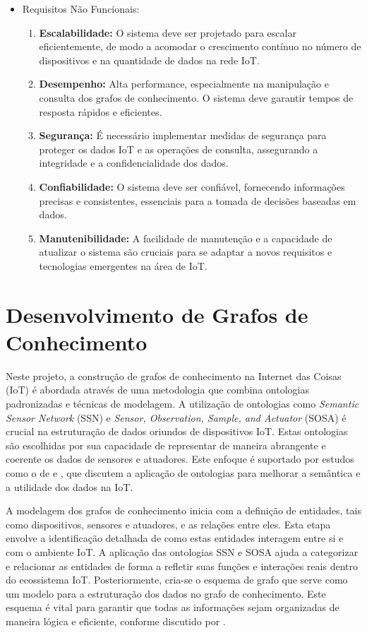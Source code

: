 \begin{itemize}
    \item Requisitos Não Funcionais:
    \begin{enumerate}
        \item \textbf{Escalabilidade:} O sistema deve ser projetado para escalar eficientemente, de modo a acomodar o crescimento contínuo no número de dispositivos e na quantidade de dados na rede IoT.
        \item \textbf{Desempenho:} Alta performance, especialmente na manipulação e consulta dos grafos de conhecimento. O sistema deve garantir tempos de resposta rápidos e eficientes.
        \item \textbf{Segurança:} É necessário implementar medidas de segurança para proteger os dados IoT e as operações de consulta, assegurando a integridade e a confidencialidade dos dados.
        \item \textbf{Confiabilidade:} O sistema deve ser confiável, fornecendo informações precisas e consistentes, essenciais para a tomada de decisões baseadas em dados.
        \item \textbf{Manutenibilidade:} A facilidade de manutenção e a capacidade de atualizar o sistema são cruciais para se adaptar a novos requisitos e tecnologias emergentes na área de IoT.
    \end{enumerate}
\end{itemize}

\section{Desenvolvimento de Grafos de Conhecimento}

Neste projeto, a construção de grafos de conhecimento na Internet das Coisas (IoT) é abordada através de uma metodologia que combina ontologias padronizadas e técnicas de modelagem. A utilização de ontologias como \textit{Semantic Sensor Network} (SSN) e \textit{Sensor, Observation, Sample, and Actuator} (SOSA) é crucial na estruturação de dados oriundos de dispositivos IoT. Estas ontologias são escolhidas por sua capacidade de representar de maneira abrangente e coerente os dados de sensores e atuadores. Este enfoque é suportado por estudos como o de \cite{Compton2012} e \cite{Haller2017}, que discutem a aplicação de ontologias para melhorar a semântica e a utilidade dos dados na IoT.

A modelagem dos grafos de conhecimento inicia com a definição de entidades, tais como dispositivos, sensores e atuadores, e as relações entre eles. Esta etapa envolve a identificação detalhada de como estas entidades interagem entre si e com o ambiente IoT. A aplicação das ontologias SSN e SOSA ajuda a categorizar e relacionar as entidades de forma a refletir suas funções e interações reais dentro do ecossistema IoT. Posteriormente, cria-se o esquema de grafo que serve como um modelo para a estruturação dos dados no grafo de conhecimento. Este esquema é vital para garantir que todas as informações sejam organizadas de maneira lógica e eficiente, conforme discutido por \cite{Hitzler2010}.

